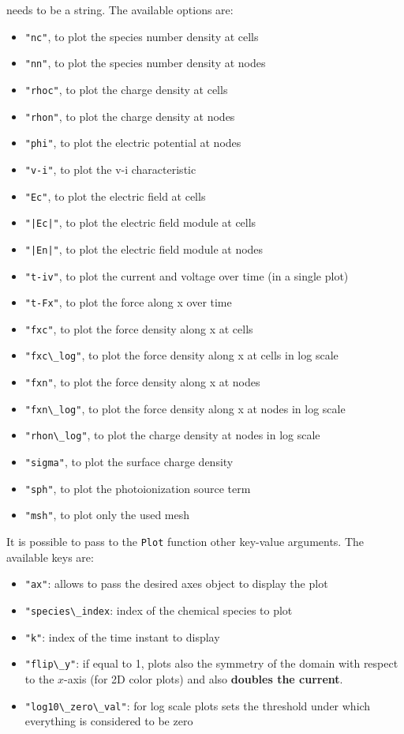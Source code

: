 \documentclass[12pt,a4paper]{article}
\newcommand{\matlabs}[1]{{\lstinline[style=MatlabStyle]!#1!}}
\begin{document}
\noindent \matlabs{<type\_value>} needs to be a string. The available options are:
\begin{itemize}
\item \matlabs{"nc"}, to plot the species number density at cells
\item \matlabs{"nn"}, to plot the species number density at nodes
\item \matlabs{"rhoc"}, to plot the charge density at cells
\item \matlabs{"rhon"}, to plot the charge density at nodes
\item \matlabs{"phi"}, to plot the electric potential at nodes
\item \matlabs{"v-i"}, to plot the v-i characteristic
\item \matlabs{"Ec"}, to plot the electric field at cells
\item \matlabs{"|Ec|"}, to plot the electric field module at cells
\item \matlabs{"|En|"}, to plot the electric field module at nodes
\item \matlabs{"t-iv"}, to plot the current and voltage over time (in a single plot)
\item \matlabs{"t-Fx"}, to plot the force along x over time 
\item \matlabs{"fxc"}, to plot the force density along x at cells
\item \matlabs{"fxc\_log"}, to plot the force density along x at cells in log scale
\item \matlabs{"fxn"}, to plot the force density along x at nodes
\item \matlabs{"fxn\_log"}, to plot the force density along x at nodes in log scale
\item \matlabs{"rhon\_log"}, to plot the charge density at nodes in log scale
\item \matlabs{"sigma"}, to plot the surface charge density
\item \matlabs{"sph"}, to plot the photoionization source term
\item \matlabs{"msh"}, to plot only the used mesh 
\end{itemize}
It is possible to pass to the \matlabs{Plot} function other key-value arguments. The available keys are:
\begin{itemize}
\item \matlabs{"ax"}: allows to pass the desired axes object to display the plot
\item \matlabs{"species\_index}: index of the chemical species to plot
\item \matlabs{"k"}: index of the time instant to display
\item \matlabs{"flip\_y"}: if equal to 1, plots also the symmetry of the domain with respect to the $x$-axis (for 2D color plots) and also \textbf{doubles the current}.
\item \matlabs{"log10\_zero\_val"}: for log scale plots sets the threshold under which everything is considered to be zero
\end{itemize}
\end{document}
